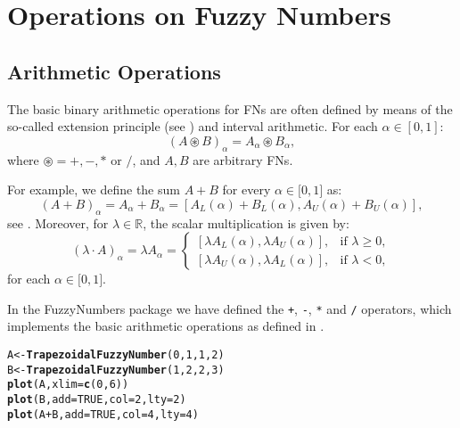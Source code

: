\documentclass[11pt]{article}\usepackage[]{graphicx}\usepackage[]{color}
\makeatletter
\newcommand{\hlnum}[1]{\textcolor[rgb]{0.686,0.059,0.569}{#1}}%
\newcommand{\hlopt}[1]{\textcolor[rgb]{0,0,0}{#1}}%
\newcommand{\hlstd}[1]{\textcolor[rgb]{0.345,0.345,0.345}{#1}}%
\newcommand{\hlkwb}[1]{\textcolor[rgb]{0.69,0.353,0.396}{#1}}%
\newcommand{\hlkwc}[1]{\textcolor[rgb]{0.333,0.667,0.333}{#1}}%
\newcommand{\hlkwd}[1]{\textcolor[rgb]{0.737,0.353,0.396}{\textbf{#1}}}%
\newenvironment{kframe}{%
 \def\at@end@of@kframe{}%
 \ifinner\ifhmode%
  \def\at@end@of@kframe{\end{minipage}}%
  \begin{minipage}{\columnwidth}%
 \fi\fi%
 \def\FrameCommand##1{\hskip\@totalleftmargin \hskip-\fboxsep
 \colorbox{shadecolor}{##1}\hskip-\fboxsep
     \hskip-\linewidth \hskip-\@totalleftmargin \hskip\columnwidth}%
 \MakeFramed {\advance\hsize-\width
   \@totalleftmargin\z@ \linewidth\hsize
   \@setminipage}}%
 {\par\unskip\endMakeFramed%
 \at@end@of@kframe}
\newenvironment{knitrout}{}{} %
\newcommand{\package}[1]{\textsf{#1}\xspace}
\makeatother
\begin{document}
\section{Operations on Fuzzy Numbers}\label{Sec:Operations}

\subsection{Arithmetic Operations}

The basic binary arithmetic operations for FNs are often defined
by means of the so-called extension principle
(see \cite{KlirYuan1995:fuzzybook})
and interval arithmetic.
For each $\alpha\in[0,1]$:
\[
   (A \circledast B)_\alpha
   = A_\alpha \circledast B_\alpha,
\]
where $\circledast=+,-,*$ or $/$,
and $A,B$ are arbitrary FNs.

For example, we define the sum $A+B$  for every
$\alpha \in \lbrack 0,1]$ as:%
\[
\left( A+B\right) _{\alpha }=A_{\alpha }+B_{\alpha }=\left[ A_{L}\left(
\alpha \right) +B_{L}\left( \alpha \right) ,A_{U}\left( \alpha \right)
+B_{U}\left( \alpha \right) \right],
\]%
see \cite{DuboisPrade1978:opfn,DiamondKloeden1994:metricspacesfs}.
Moreover, for $\lambda \in \mathbb{R}$,
the scalar multiplication is given by:
\[
\left( \lambda \cdot A\right) _{\alpha }=\lambda A_{\alpha }=\left\{
\begin{array}{ll}
\left[ \lambda A_{L}\left( \alpha \right) ,\lambda A_{U}\left( \alpha
\right) \right] , & \text{if }\lambda \geq 0, \\
\left[ \lambda A_{U}\left( \alpha \right) ,\lambda A_{L}\left( \alpha
\right) \right] , & \text{if }\lambda <0,%
\end{array}%
\right.
\]%
for each $\alpha \in \lbrack 0,1]$.



In the \package{FuzzyNumbers} package we have defined
the \texttt{+}, \texttt{-}, \texttt{*} and \texttt{/} operators,
which implements the basic arithmetic operations
as defined in \cite{KlirYuan1995:fuzzybook}.


\begin{knitrout}\small
{}\color{fgcolor}\begin{kframe}
\begin{alltt}
\hlstd{A} \hlkwb{<-} \hlkwd{TrapezoidalFuzzyNumber}\hlstd{(}\hlnum{0}\hlstd{,} \hlnum{1}\hlstd{,} \hlnum{1}\hlstd{,} \hlnum{2}\hlstd{)}
\hlstd{B} \hlkwb{<-} \hlkwd{TrapezoidalFuzzyNumber}\hlstd{(}\hlnum{1}\hlstd{,} \hlnum{2}\hlstd{,} \hlnum{2}\hlstd{,} \hlnum{3}\hlstd{)}
\hlkwd{plot}\hlstd{(A,} \hlkwc{xlim}\hlstd{=}\hlkwd{c}\hlstd{(}\hlnum{0}\hlstd{,}\hlnum{6}\hlstd{))}
\hlkwd{plot}\hlstd{(B,} \hlkwc{add}\hlstd{=}\hlnum{TRUE}\hlstd{,} \hlkwc{col}\hlstd{=}\hlnum{2}\hlstd{,} \hlkwc{lty}\hlstd{=}\hlnum{2}\hlstd{)}
\hlkwd{plot}\hlstd{(A}\hlopt{+}\hlstd{B,} \hlkwc{add}\hlstd{=}\hlnum{TRUE}\hlstd{,} \hlkwc{col}\hlstd{=}\hlnum{4}\hlstd{,} \hlkwc{lty}\hlstd{=}\hlnum{4}\hlstd{)}
\end{alltt}
\end{kframe}
\end{knitrout}
\end{document}
